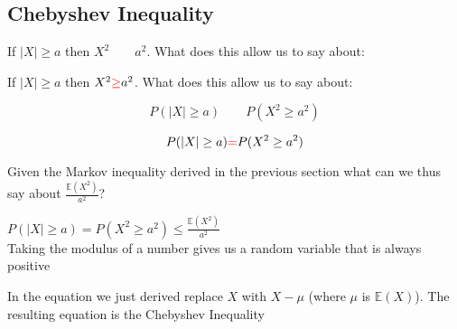 \documentclass[paper=a4, fontsize=11pt]{scrartcl}
\newcommand{\red}[1]{{\color{red}#1}}
\numberwithin{equation}{section}
\numberwithin{figure}{section}
\numberwithin{table}{section}
\begin{document}
\subsection{Chebyshev Inequality}

\begin{questions}
\noindent If $|X| \ge a$ then $X^2 \qquad a^2$.  What does this allow us to say
about:
\end{questions}

\begin{answers}
\noindent If $|X| \ge a$ then $X^2 \red{\ge} a^2$.  What does this allow us to
say
about:
\end{answers}

\begin{questions}
\begin{equation}
 P(|X| \ge a) \qquad P(X^2 \ge a^2)
\end{equation}
\end{questions}

\begin{answers}
\begin{equation}
 P(|X| \ge a) \red{=} P(X^2 \ge a^2)
\end{equation}
\end{answers}

\noindent Given the Markov inequality derived in the previous section what can
we thus say about $\frac{\mathbb{E}(X^2)}{a^2}$?

\begin{questions}
\vspace{2cm}
\end{questions}

\begin{answers}
\vspace{0.25cm}
\red{ 
$P(|X| \ge a) = P(X^2 \ge a^2) \le \frac{\mathbb{E}(X^2)}{a^2}$ \\

Taking the modulus of a number gives us a random variable that is always
positive
}
\vspace{0.25cm}
\end{answers}

\noindent In the equation we just derived replace $X$ with $X-\mu$ (where $\mu$
is $\mathbb{E}(X)$).  The resulting equation is the Chebyshev Inequality 

\begin{questions}
\vspace{2cm}
\end{questions}
\end{document}
